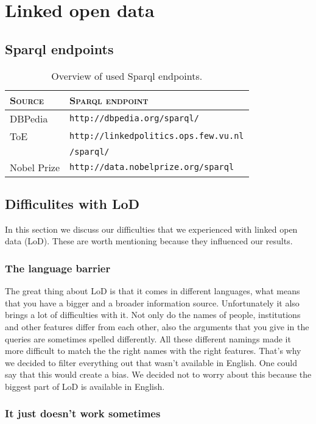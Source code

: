 \pagebreak
\section{Linked open data}
\label{sec:lod}
\subsection{Sparql endpoints}
\begin{table}[H]
\centering
\begin{tabular}{l|l}
	\textbf{\textsc{Source}} & \textbf{\textsc{Sparql endpoint}} \\ \hline
	\rule{0pt}{4mm}DBPedia & \texttt{http://dbpedia.org/sparql/} \\
	ToE &  \texttt{http://linkedpolitics.ops.few.vu.nl} \\
	& \texttt{/sparql/} \\
	Nobel Prize & \texttt{http://data.nobelprize.org/sparql}
\end{tabular}
\caption{Overview of used Sparql endpoints.}
\end{table}
\subsection{Difficulites with LoD}
In this section we discuss our difficulties that we experienced with linked open data (LoD). These are worth mentioning because they influenced our results.

\subsubsection{The language barrier}
The great thing about LoD is that it comes in different languages, what means that you have a bigger and a broader information source.
Unfortunately it also brings a lot of difficulties with it.
Not only do the names of people, institutions and other features differ from each other, also the arguments that you give in the queries are sometimes spelled differently.
All these different namings made it more difficult to match the the right names with the right features.
That's why we decided to filter everything out that wasn't available in English. One could say that this would create a bias. We decided not to worry about this because the biggest part of LoD is available in English.

\subsubsection{It just doesn't work sometimes}

